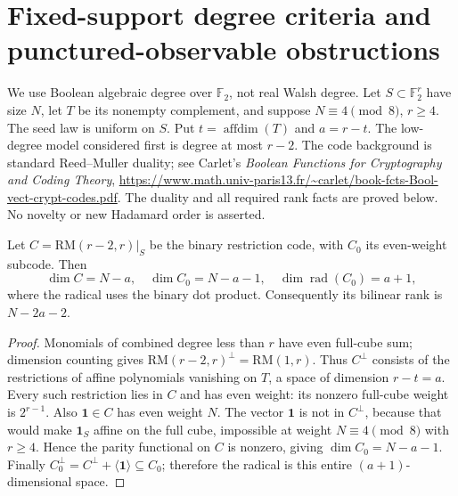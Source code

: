 \section{Fixed-support degree criteria and punctured-observable obstructions}
\label{sec:nonlinear-fixed-support}
We use Boolean algebraic degree over $\mathbb F_2$, not real Walsh degree.
Let $S\subset\mathbb F_2^r$ have size $N$, let $T$ be its nonempty
complement, and suppose $N\equiv4\pmod8$, $r\ge4$. The seed law is
uniform on $S$. Put $t=\operatorname{affdim}(T)$ and $a=r-t$.
The low-degree model considered first is degree at most $r-2$.
The code background is standard Reed--Muller duality; see Carlet's
\emph{Boolean Functions for Cryptography and Coding Theory},
\url{https://www.math.univ-paris13.fr/~carlet/book-fcts-Bool-vect-crypt-codes.pdf}.
The duality and all required rank facts are proved below. No novelty
or new Hadamard order is asserted.

\begin{lemma}
\label{lem:nonlinear-radical}
Let $C=\mathrm{RM}(r-2,r)|_S$ be the binary restriction code, with
$C_0$ its even-weight subcode. Then
\[
 \dim C=N-a,\quad \dim C_0=N-a-1,\quad
 \dim\operatorname{rad}(C_0)=a+1,
\]
where the radical uses the binary dot product. Consequently its bilinear
rank is $N-2a-2$.
\end{lemma}
\begin{proof}
Monomials of combined degree less than $r$ have even full-cube sum;
dimension counting gives $\mathrm{RM}(r-2,r)^\perp=\mathrm{RM}(1,r)$.
Thus $C^\perp$ consists of the restrictions of affine polynomials
vanishing on $T$, a space of dimension $r-t=a$. Every such restriction
lies in $C$ and has even weight: its nonzero full-cube weight is $2^{r-1}$.
Also $\mathbf1\in C$ has even weight $N$.
The vector $\mathbf1$ is not in $C^\perp$, because that would make
$\mathbf1_S$ affine on the full cube, impossible at weight
$N\equiv4\pmod8$ with $r\ge4$. Hence the parity functional on $C$ is
nonzero, giving $\dim C_0=N-a-1$. Finally
$C_0^\perp=C^\perp+\langle\mathbf1\rangle\subseteq C_0$;
therefore the radical is this entire $(a+1)$-dimensional space.
\end{proof}

